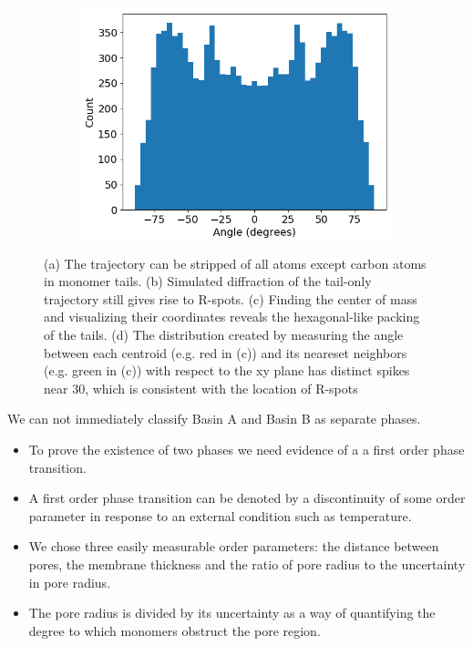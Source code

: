 \documentclass{article}
\begin{document}
\begin{figure}[!ht]
\begin{subfigure}{0.45\textwidth}
		\caption{}\label{fig:centroids}
	\end{subfigure}
	\begin{subfigure}{0.45\textwidth}
		\centering
		\includegraphics[width=\textwidth]{angles_traj_layered.png}
		\caption{}\label{fig:angle_distribution}
	\end{subfigure}
	\caption{(a) The trajectory can be stripped of all atoms except carbon
	atoms in monomer tails. (b) Simulated diffraction of the tail-only trajectory
	still gives rise to R-spots. (c) Finding the center of mass and visualizing 
	their coordinates reveals the hexagonal-like packing of the tails. (d) The 
	distribution created by measuring the angle between each centroid (e.g. red 
	in (c)) and its neareset neighbors (e.g. green in (c)) with respect to the xy
	plane has distinct spikes near 30\degree, which is consistent with the location
	of R-spots}\label{fig:tail_packing}
  \end{figure}
  
  We can not immediately classify Basin A and Basin B as separate phases.
  \begin{itemize}
	\item To prove the existence of two phases we need evidence of a
	a first order phase transition.
	\item A first order phase transition can be denoted by a discontinuity
        of some order parameter in response to an external condition such as
	temperature.
	\item We chose three easily measurable order parameters: the distance
	between pores, the membrane thickness and the ratio of pore radius to
	the uncertainty in pore radius.  %
        \item The pore radius is divided by its uncertainty as a way of quantifying
        the degree to which monomers obstruct the pore region.
  \end{itemize}
\end{document}
